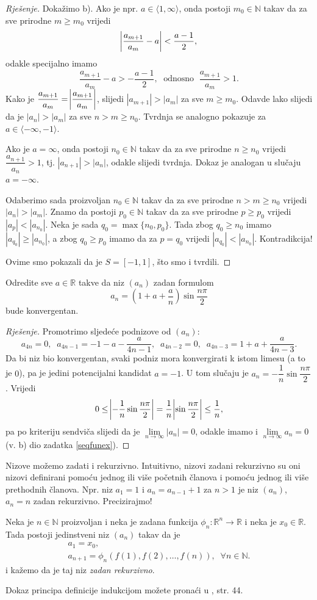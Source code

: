 \begin{proof}[Rješenje]
Dokažimo b). Ako je npr. $a\in \langle 1, \infty\rangle$, onda postoji $m_0\in \mathbb{N}$ takav da za sve prirodne $m\geq m_0$ vrijedi $$\abs{\dfrac{a_{m+1}}{a_m}-a}<\dfrac{a-1}{2},$$
odakle specijalno imamo
$$\dfrac{a_{m+1}}{a_m}-a>-\dfrac{a-1}{2},\;\text{ odnosno }\; \dfrac{a_{m+1}}{a_m}>1.$$
Kako je $\dfrac{a_{m+1}}{a_m}=\abs{\dfrac{a_{m+1}}{a_m}}$, slijedi $|a_{m+1}|>|a_m|$ za sve $m\geq m_0$. Odavde lako slijedi da je $|a_{n}|>|a_m|$ za sve $n>m\geq n_0$. Tvrdnja se analogno pokazuje za $a\in \langle -\infty, -1\rangle$.

Ako je $a=\infty$, onda postoji $n_0\in \mathbb{N}$ takav da za sve prirodne $n\geq n_0$ vrijedi $\dfrac{a_{n+1}}{a_n}>1$, tj. $|a_{n+1}|>|a_n|$, odakle slijedi tvrdnja. Dokaz je analogan u slučaju $a=-\infty$.

Odaberimo sada proizvoljan $n_0\in \mathbb{N}$ takav da za sve prirodne $n>m\geq n_0$ vrijedi $|a_n|>|a_m|$. Znamo da postoji $p_0\in \mathbb{N}$ takav da za sve prirodne $p\geq p_0$ vrijedi $|a_p|<|a_{n_0}|$. Neka je sada $q_0=\max\{n_0, p_0\}$. Tada zbog $q_0\geq n_0$ imamo $|a_{q_0}|\geq |a_{n_0}|$, a zbog $q_0\geq p_0$ imamo da za $p=q_0$ vrijedi $|a_{q_0}|<|a_{n_0}|$. Kontradikcija!

Ovime smo pokazali da je $S=[-1, 1]$, što smo i tvrdili.
\end{proof}
\begin{exercise}
Odredite sve $a\in \mathbb{R}$ takve da niz $(a_n)$ zadan formulom $$a_n=\left(1+a+\dfrac{a}{n}\right)\sin{\dfrac{n\pi}{2}}$$
bude konvergentan.
\end{exercise}
\begin{proof}[Rješenje]
Promotrimo sljedeće podnizove od $(a_n)$:
$$a_{4n}=0,\;\;a_{4n-1}=-1-a-\dfrac{a}{4n-1},\;\;a_{4n-2}=0,\;\;a_{4n-3}=1+a+\dfrac{a}{4n-3}.$$
Da bi niz bio konvergentan, svaki podniz mora konvergirati k istom limesu (a to je $0$), pa je jedini potencijalni kandidat $a=-1$. U tom slučaju je $a_n=-\dfrac{1}{n}\sin{\dfrac{n\pi}{2}}$. Vrijedi
$$0\leq \abs{-\dfrac{1}{n}\sin{\dfrac{n\pi}{2}}}=\dfrac{1}{n}\abs{\sin{\dfrac{n\pi}{2}}}\leq \dfrac{1}{n},$$
pa po kriteriju sendviča slijedi da je $\lim\limits_{n\to \infty}{|a_n|}=0$, odakle imamo i $\lim\limits_{n\to \infty}{a_n}=0$ (v. b) dio zadatka \ref{seqfunex}).
\end{proof}
Nizove možemo zadati i rekurzivno. Intuitivno, nizovi zadani rekurzivno su oni nizovi definirani pomoću jednog ili više početnih članova i pomoću jednog ili više prethodnih članova. Npr. niz $a_1=1$ i $a_n=a_{n-1}+1$ za $n>1$ je niz $(a_n)$, $a_n=n$ zadan rekurzivno. Precizirajmo!
\begin{remark}
Neka je $n\in \mathbb{N}$ proizvoljan i neka je zadana funkcija $\phi_n : \mathbb{R}^n\to \mathbb{R}$ i neka je $x_0\in \mathbb{R}$. Tada postoji jedinstveni niz $(a_n)$ takav da je
\begin{gather*}
a_1=x_0,\\
a_{n+1}=\phi_n\left( f(1), f(2), \dots, f(n)\right),\;\; \forall n\in \mathbb{N}.
\end{gather*}
i kažemo da je taj niz \textit{zadan rekurzivno}. 
\end{remark} 
Dokaz principa definicije indukcijom možete pronaći u \cite{9}, str. 44.

